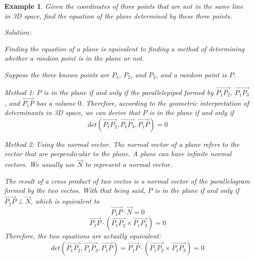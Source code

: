 \documentclass{article}
\newtheorem{example}{Example}
\begin{document}
\begin{example}
Given the coordinates of three points that are not in the same line in 3D space,
find the equation of the plane determined by these three points.

Solution:

Finding the equation of a plane is equivalent to finding a method of
determining whether a random point is in the plane or not.

Suppose the three known points are $P_1$, $P_2$, and $P_3$, and a random point
is $P$.

Method 1: $P$ is in the plane if and only if the parallelepiped formed by
$\vec{P_1P_2}$, $\vec{P_1P_3}$, and $\vec{P_1P}$ has a volume $0$. Therefore,
according to the geometric interpretation of determinants in 3D space, we can
derive that $P$ is in the plane if and only if
\[
  det(\vec{P_1P_2}, \vec{P_1P_3}, \vec{P_1P}) = 0
\]

Method 2: Using the normal vector. The normal vector of a plane refers to the
vector that are perpendicular to the plane. A plane can have infinite normal
vectors. We usually use $\vec{N}$ to represent a normal vector. 

The result of a cross product of two vectos is a normal vector of the
parallelogram formed by the two vectos. With that being said, $P$ is in the
plane if and only if $\vec{P_1P} \perp \vec{N}$, which is equivalent to
\[
  \vec{P_1P} \cdot \vec{N} = 0
\]
\[
  \vec{P_1P} \cdot (\vec{P_1P_2} \times \vec{P_1P_3}) = 0
\]
Therefore, the two equations are actually equivalent:
\[
  det(\vec{P_1P_2}, \vec{P_1P_3}, \vec{P_1P}) = \vec{P_1P} \cdot (\vec{P_1P_2} \times \vec{P_1P_3}) = 0
\]

\end{example}
\end{document}
